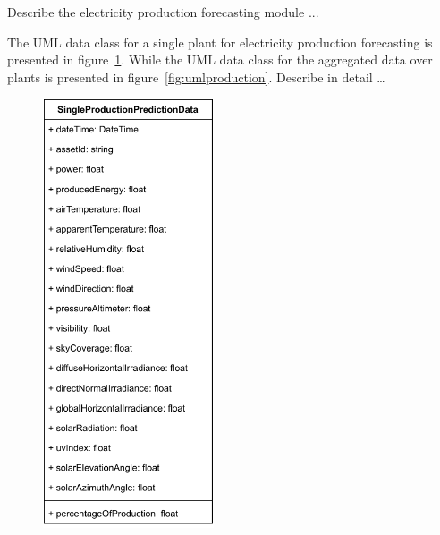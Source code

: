 Describe the electricity production forecasting module ...

The UML data class for a single plant for electricity production forecasting is presented in figure~\ref{fig:umlsingleplant}.
While the UML data class for the aggregated data over plants is presented in figure~\ref{fig:umlproduction}.
Describe in detail …

\begin{figure}[H]
\begin{minipage}[b]{8.5cm}
\centering
\includegraphics[width=0.45\textwidth]{images/single_plant_uml}
\subcaption{}
\label{fig:umlsingleplant}
\end{minipage}
\ \hspace{2mm} \
\begin{minipage}[b]{8.5cm}
\centering

\end{minipage}
\end{figure}
